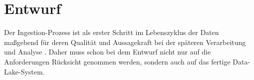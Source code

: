 \chapter{Entwurf}

Der Ingestion-Prozess ist als erster Schritt im Lebenszyklus der Daten maßgebend für deren Qualität und Aussagekraft bei der späteren Verarbeitung und Analyse \parencite{ingestion_01}.
Daher muss schon bei dem Entwurf nicht nur auf die Anforderungen Rücksicht genommen werden, sondern auch auf das fertige Data-Lake-System.






